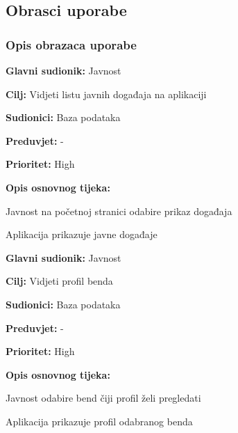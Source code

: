 \eject 
			
			
				
\subsection{Obrasci uporabe}
\subsubsection{Opis obrazaca uporabe}
\noindent {}
	\begin{packed_item}
		
		\item \textbf{Glavni sudionik: } Javnost
		\item  \textbf{Cilj:} Vidjeti listu javnih događaja na aplikaciji
		\item  \textbf{Sudionici:} Baza podataka
		\item  \textbf{Preduvjet:} -
		\item  \textbf{Prioritet:} High
		\item  \textbf{Opis osnovnog tijeka:}
		
		\item[] \begin{packed_enum}
			\item Javnost na početnoj stranici odabire prikaz događaja
			\item Aplikacija prikazuje javne događaje
		\end{packed_enum}
		
	\end{packed_item}


\noindent {}
	\begin{packed_item}
	
		\item \textbf{Glavni sudionik:} Javnost
		\item  \textbf{Cilj:} Vidjeti profil benda
		\item  \textbf{Sudionici:} Baza podataka
		\item  \textbf{Preduvjet:} -
		\item  \textbf{Prioritet:} High
		\item  \textbf{Opis osnovnog tijeka:}
		
		\item[] \begin{packed_enum}
			\item Javnost odabire bend čiji profil želi pregledati
			\item Aplikacija prikazuje profil odabranog benda
		\end{packed_enum}
	\end{packed_item}

